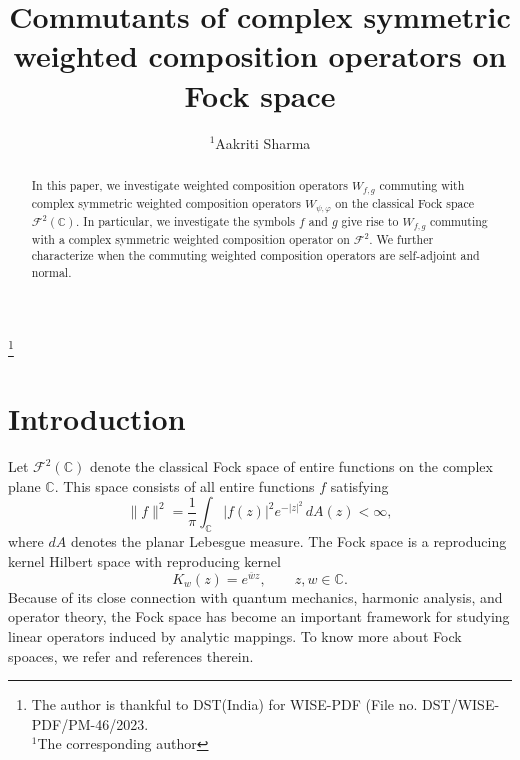 \documentclass[reqno]{amsart}
\theoremstyle{remark}
\theoremstyle{Definition}
\theoremstyle{remark}
\numberwithin{equation}{section}
\begin{document}
\title[Complex symmetric operator ]{Commutants of complex symmetric weighted composition operators on Fock space}
\thanks{The author is thankful to  DST(India) for WISE-PDF  (File no. DST/WISE-PDF/PM-46/2023.\\ $^1$The corresponding author}


\author[A. Sharma]{$^1$Aakriti
 Sharma}

\address{
Department of Mathematics, University of Jammu-180006, J\&{K},
 India.}





\begin{abstract}

In this paper, we investigate weighted composition operators $W_{f,g}$ commuting with complex symmetric weighted composition operators $W_{\psi, \varphi}$ on the classical Fock space $\mathcal{F}^{2}(\mathbb{C})$. In particular, we investigate the symbols $f$ and $g$ give rise to $W_{f,g}$ commuting with a complex symmetric weighted composition operator on $\mathcal{F}^{2}$. We further characterize when the commuting weighted composition operators are self-adjoint and normal.

 \end{abstract}

\maketitle

\section{Introduction}\label{sec:intr}
Let $\mathcal{F}^{2}(\mathbb{C})$ denote the classical Fock space of entire functions on the complex plane $\mathbb{C}$. This space consists of all entire functions $f$ satisfying
\[
\|f\|^{2}
=
\frac{1}{\pi}
\int_{\mathbb{C}}
|f(z)|^{2}e^{-|z|^{2}}\,dA(z)
<
\infty,
\]
where $dA$ denotes the planar Lebesgue measure. The Fock space is a reproducing kernel Hilbert space with reproducing kernel
\[
K_{w}(z)=e^{\overline{w}z},
\qquad z,w\in\mathbb{C}.
\]
Because of its close connection with quantum mechanics, harmonic analysis, and operator theory, the Fock space has become an important framework for studying linear operators induced by analytic mappings. To know more about Fock spoaces, we refer \cite{KZ} and references therein.
\end{document}
